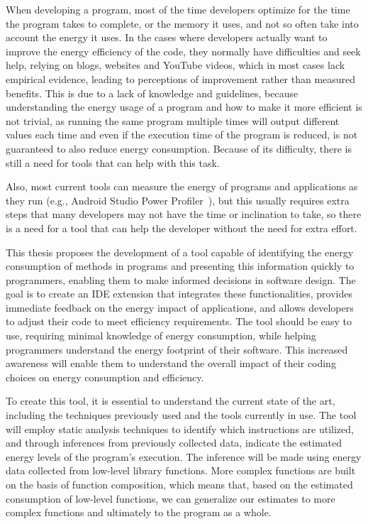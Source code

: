 \documentclass[sigplan]{acmart}
\begin{document}
When developing a program, most of the time developers optimize for the time the program takes to complete, or the memory it uses, and not so often take into account the energy it uses. 
In the cases where developers actually want to improve the energy efficiency of the code, they normally have difficulties and seek help, relying on blogs, websites and YouTube videos, which in most cases lack empirical evidence, leading to perceptions of improvement rather than measured benefits\cite{10.1145/3154384}. This is due to a lack of knowledge and guidelines, because understanding the energy usage of a program and how to make it more efficient is not trivial, as running the same program multiple times will output different values each time and even if the execution time of the program is reduced, is not guaranteed to also reduce energy consumption. Because of its difficulty, there is still a need for tools that can help with this task\cite{10.1145/2597073.2597110}. 

Also, most current tools can measure the energy of programs and applications as they run (e.g., Android Studio Power Profiler~\cite{android_power_profiler}), but this usually requires extra steps that many developers may not have the time or inclination to take, so there is a need for a tool that can help the developer without the need for extra effort\cite{10.1145/3154384}.

This thesis proposes the development of a tool capable of identifying the energy consumption of methods in programs and presenting this information quickly to programmers, enabling them to make informed decisions in software design. The goal is to create an IDE extension that integrates these functionalities, provides immediate feedback on the energy impact of applications, and allows developers to adjust their code to meet efficiency requirements. The tool should be easy to use, requiring minimal knowledge of energy consumption, while helping programmers understand the energy footprint of their software. This increased awareness will enable them to understand the overall impact of their coding choices on energy consumption and efficiency.

To create this tool, it is essential to understand the current state of the art, including the techniques previously used and the tools currently in use. The tool will employ static analysis techniques to identify which instructions are utilized, and through inferences from previously collected data, indicate the estimated energy levels of the program's execution. The inference will be made using energy data collected from low-level library functions. More complex functions are built on the basis of function composition, which means that, based on the estimated consumption of low-level functions, we can generalize our estimates to more complex functions and ultimately to the program as a whole. 
\end{document}
